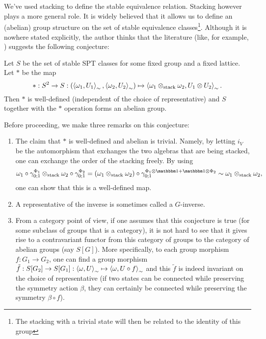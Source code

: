\documentclass[11pt,a4paper,twoside]{article}
\numberwithin{equation}{section}
\begin{document}
	\\\\
	We've used stacking to define the stable equivalence relation. Stacking however plays a more general role. It is widely believed that it allows us to define an (abelian) group structure on the set of stable equivalence classes\footnote{The stacking with a trivial state will then be related to the identity of this group}. Although it is nowhere stated explicitly, the author thinks that the literature (like, for example, \cite{kapustin2021classification}) suggests the following conjecture:
	\begin{conjecture}\label{conj:StableEquivGroupStructure}
		Let $S$ be the set of stable SPT classes for some fixed group and a fixed lattice. Let $*$ be the map
		\begin{equation}
			*:S^2\rightarrow S:(\expval{\omega_1,U_1}_{\sim},\expval{\omega_2,U_2}_{\sim})\mapsto \expval{\omega_1\otimes_\text{stack}\omega_2,U_1\otimes U_2}_{\sim}.
		\end{equation}
		Then $*$ is well-defined (independent of the choice of representative) and $S$ together with the $*$ operation forms an abelian group.
	\end{conjecture}
	Before proceeding, we make three remarks on this conjecture:
	\begin{enumerate}
		\item The claim that $*$ is well-defined and abelian is trivial. Namely, by letting $i_V$ be the automorphism that exchanges the two algebras that are being stacked, one can exchange the order of the stacking freely. By using
		\begin{equation}
			\omega_1\circ\gamma^{\Phi_1}_{0;1}\otimes_\text{stack}\omega_2\circ\gamma^{\Phi_2}_{0;1}=(\omega_1\otimes_{\text{stack}}\omega_2)\circ\gamma^{\Phi_1\otimes\id+\id\otimes\Phi_2}_{0;1}\sim\omega_1\otimes_{\text{stack}}\omega_2,
		\end{equation}
		one can show that this is a well-defined map.
		\item A representative of the inverse is sometimes called a $G$-inverse.
		\item From a category point of view, if one assumes that this conjecture is true (for some subclass of groups that is a category), it is not hard to see that it gives rise to a contravariant functor from this category of groups to the category of abelian groups (say $S[G]$). More specifically, to each group morphism $f:G_1\rightarrow G_2$, one can find a group morphism $\tilde{f}:S[G_2]\rightarrow S[G_1]:\expval{\omega,U}_\sim\mapsto \expval{\omega,U\circ f}_\sim$ and this $\tilde{f}$ is indeed invariant on the choice of representative (if two states can be connected while preserving the symmetry action $\beta$, they can certainly be connected while preserving the symmetry $\beta\circ f$).
	\end{enumerate}
\end{document}
